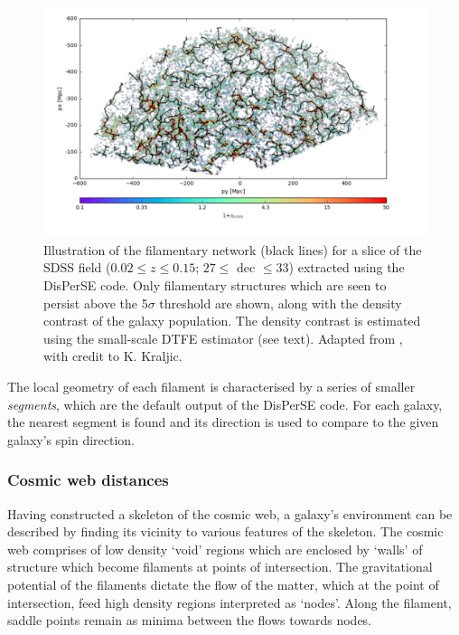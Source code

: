 \begin{figure}
    \centering
	\includegraphics[width=\linewidth]{thesis/latex/halo_assembly_manga/SDSS_CW_DisPerSE.pdf}
    \caption[Illustration of the filamentary network for a slice of the SDSS field.]{Illustration of the filamentary network (black lines) for a slice of the SDSS field ($0.02 \leq z \leq 0.15$; $ 27 \leq$ dec $\leq 33$) extracted using the DisPerSE code. Only filamentary structures which are seen to persist above the 5$\sigma$ threshold are shown, along with the density contrast of the galaxy population. The density contrast is estimated using the small-scale DTFE estimator (see text). Adapted from \citet{duckworth2019_halo}, with credit to K. Kraljic.}
    \label{fig:disperse_sdss}
\end{figure}

The local geometry of each filament is characterised by a series of smaller \textit{segments}, which are the default output of the DisPerSE code. For each galaxy, the nearest segment is found and its direction is used to compare to the given galaxy's spin direction. 

\subsubsection{Cosmic web distances} \label{sec:cosmic_web_distances}
Having constructed a skeleton of the cosmic web, a galaxy's environment can be described by finding its vicinity to various features of the skeleton. The cosmic web comprises of low density `void' regions which are enclosed by `walls' of structure which become filaments at points of intersection. The gravitational potential of the filaments dictate the flow of the matter, which at the point of intersection, feed high density regions interpreted as `nodes'. Along the filament, saddle points remain as minima between the flows towards nodes. 

